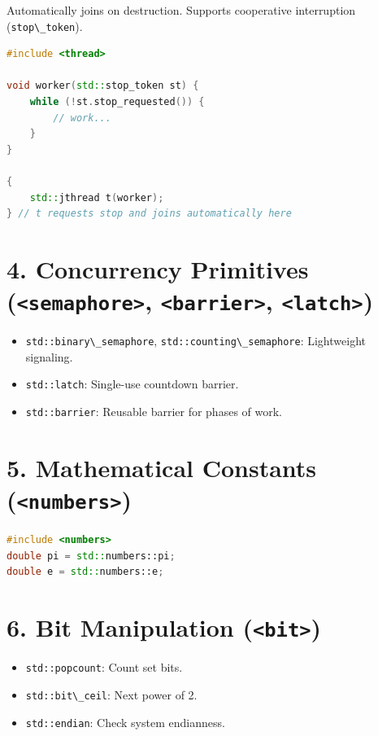 Automatically joins on destruction. Supports cooperative interruption
(\passthrough{\lstinline!stop\_token!}).

\begin{lstlisting}[language={C++}]
#include <thread>

void worker(std::stop_token st) {
    while (!st.stop_requested()) {
        // work...
    }
}

{
    std::jthread t(worker);
} // t requests stop and joins automatically here
\end{lstlisting}

\hypertarget{concurrency-primitives-semaphore-barrier-latch}{%
\section{\texorpdfstring{4. Concurrency Primitives
(\texttt{\textless{}semaphore\textgreater{}},
\texttt{\textless{}barrier\textgreater{}},
\texttt{\textless{}latch\textgreater{}})}{4. Concurrency Primitives (\textless semaphore\textgreater, \textless barrier\textgreater, \textless latch\textgreater)}}\label{concurrency-primitives-semaphore-barrier-latch}}

\begin{itemize}
\tightlist
\item
  \passthrough{\lstinline!std::binary\_semaphore!},
  \passthrough{\lstinline!std::counting\_semaphore!}: Lightweight
  signaling.
\item
  \passthrough{\lstinline!std::latch!}: Single-use countdown barrier.
\item
  \passthrough{\lstinline!std::barrier!}: Reusable barrier for phases of
  work.
\end{itemize}

\hypertarget{mathematical-constants-numbers}{%
\section{\texorpdfstring{5. Mathematical Constants
(\texttt{\textless{}numbers\textgreater{}})}{5. Mathematical Constants (\textless numbers\textgreater)}}\label{mathematical-constants-numbers}}

\begin{lstlisting}[language={C++}]
#include <numbers>
double pi = std::numbers::pi;
double e = std::numbers::e;
\end{lstlisting}

\hypertarget{bit-manipulation-bit}{%
\section{\texorpdfstring{6. Bit Manipulation
(\texttt{\textless{}bit\textgreater{}})}{6. Bit Manipulation (\textless bit\textgreater)}}\label{bit-manipulation-bit}}

\begin{itemize}
\tightlist
\item
  \passthrough{\lstinline!std::popcount!}: Count set bits.
\item
  \passthrough{\lstinline!std::bit\_ceil!}: Next power of 2.
\item
  \passthrough{\lstinline!std::endian!}: Check system endianness.
\end{itemize}
